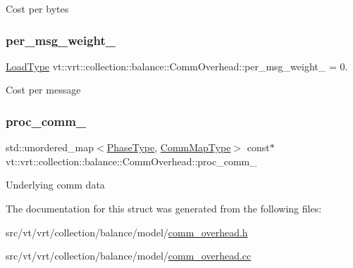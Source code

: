 Cost per bytes \mbox{\label{structvt_1_1vrt_1_1collection_1_1balance_1_1_comm_overhead_addb20b685e8319db616934d8ca7a12f5}} 
\subsubsection{\texorpdfstring{per\+\_\+msg\+\_\+weight\+\_\+}{per\_msg\_weight\_}}
{\footnotesize\ttfamily \hyperlink{namespacevt_a8fb51741340b87d7aaee0bef60e9896b}{Load\+Type} vt\+::vrt\+::collection\+::balance\+::\+Comm\+Overhead\+::per\+\_\+msg\+\_\+weight\+\_\+ = 0.\hspace{0.3cm}{\ttfamily [private]}}

Cost per message \mbox{\label{structvt_1_1vrt_1_1collection_1_1balance_1_1_comm_overhead_a6c5e0954d01ac8c05a44dfabdc053e0e}} 
\subsubsection{\texorpdfstring{proc\+\_\+comm\+\_\+}{proc\_comm\_}}
{\footnotesize\ttfamily std\+::unordered\+\_\+map$<$\hyperlink{namespacevt_a46ce6733d5cdbd735d561b7b4029f6d7}{Phase\+Type}, \hyperlink{namespacevt_1_1vrt_1_1collection_1_1balance_a01ee1fb0ae2da1d2ab7fdca3be9ae351}{Comm\+Map\+Type}$>$ const$\ast$ vt\+::vrt\+::collection\+::balance\+::\+Comm\+Overhead\+::proc\+\_\+comm\+\_\+\hspace{0.3cm}{\ttfamily [private]}}

Underlying comm data 

The documentation for this struct was generated from the following files\+:\begin{DoxyCompactItemize}
\item 
src/vt/vrt/collection/balance/model/\hyperlink{comm__overhead_8h}{comm\+\_\+overhead.\+h}\item 
src/vt/vrt/collection/balance/model/\hyperlink{comm__overhead_8cc}{comm\+\_\+overhead.\+cc}\end{DoxyCompactItemize}
